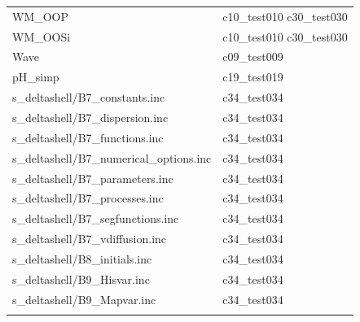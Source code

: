 \begin{longtable}{ll}
WM\_OOP & c10\_test010 c30\_test030 \\
WM\_OOSi & c10\_test010 c30\_test030 \\
Wave & c09\_test009 \\
pH\_simp & c19\_test019 \\
s\_deltashell/B7\_constants.inc & c34\_test034 \\
s\_deltashell/B7\_dispersion.inc & c34\_test034 \\
s\_deltashell/B7\_functions.inc & c34\_test034 \\
s\_deltashell/B7\_numerical\_options.inc & c34\_test034 \\
s\_deltashell/B7\_parameters.inc & c34\_test034 \\
s\_deltashell/B7\_processes.inc & c34\_test034 \\
s\_deltashell/B7\_segfunctions.inc & c34\_test034 \\
s\_deltashell/B7\_vdiffusion.inc & c34\_test034 \\
s\_deltashell/B8\_initials.inc & c34\_test034 \\
s\_deltashell/B9\_Hisvar.inc & c34\_test034 \\
s\_deltashell/B9\_Mapvar.inc & c34\_test034 \\

\hline \\
\end{longtable}
